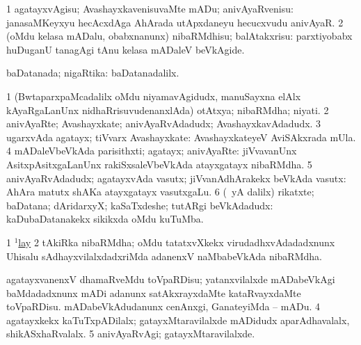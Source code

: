 \bentry
{}
\gl{\sakirx}
\bmng
\bnum
\num{1} agatayxvAgisu; AvashayxkavenisuvaMte mADu; anivAyaRvenisu:  janasaMKeyxyu hecAcxdAga AhArada utApxdaneyu hecucxvudu anivAyaR. 
\num{2} (oMdu kelasa mADalu, obabxnanunx) nibaRMdhisu; balAtakxrisu:  parxtiyobabx huDuganU tanagAgi tAnu kelasa mADaleV beVkAgide. 
\enum
\emng
\eentry

\bentry
{}
\gl{\gu}
\bmng
baDatanada; nigaRtika:  baDatanadalilx. 
\emng
\eentry

\bentry
{}
\gl{\nA}
\bmng
\bnum
\num{1} (BwtaparxpaMcadalilx oMdu niyamavAgidudx, manuSayxna elAlx kAyaRgaLanUnx nidhaRrisuvudenanxlAda) otAtxya; nibaRMdha; niyati. 
\num{2} anivAyaRte; Avashayxkate; anivAyaRvAdadudx; AvashayxkavAdadudx. 
\num{3} ugarxvAda agatayx; tiVvarx Avashayxkate:  AvashayxkateyeV AviSAkxrada mUla. 
\num{4} mADaleVbeVkAda parisithxti; agatayx; anivAyaRte:  jiVvavanUnx AsitxpAsitxgaLanUnx rakiSxsaleVbeVkAda atayxgatayx nibaRMdha. 
\num{5} anivAyaRvAdadudx; agatayxvAda vasutx; jiVvanAdhArakekx beVkAda vasutx:  AhAra matutx shAKa atayxgatayx vasutxgaLu. 
\num{6} (\Eva\ yA \bava dalilx) rikatxte; baDatana; dAridarxyX; kaSaTxdeshe; tutARgi beVkAdadudx:  kaDubaDatanakekx sikikxda oMdu kuTuMba. 
\enum
\emng

\noindent
\gl{\pagu}
\bmng
\bnum
\num{1} \hyperref{kandict_l.pdf}{L}{lay(1) nuga(23)}{$^1$lay}  
\num{2}  tAkiRka nibaRMdha; oMdu tatatxvXkekx virudadhxvAdadadxnunx Uhisalu sAdhayxvilalxdadxriMda adanenxV naMbabeVkAda nibaRMdha. 
  
\banum
{} agatayxvanenxV dhamaRveMdu toVpaRDisu; yatanxvilalxde mADabeVkAgi baMdadadxnunx mADi adanunx satAkxrayxdaMte kataRvayxdaMte toVpaRDisu. 
 mADabeVkAdudanunx cenAnxgi, GanateyiMda -- mADu. 
\eanum
\numie
\num{4}  agatayxkekx kaTuTxpADilalx; gatayxMtaravilalxde mADidudx aparAdhavalalx, shikASxhaRvalalx. 
\num{5}  anivAyaRvAgi; gatayxMtaravilalxde. 
\enum
\emng
\eentry


